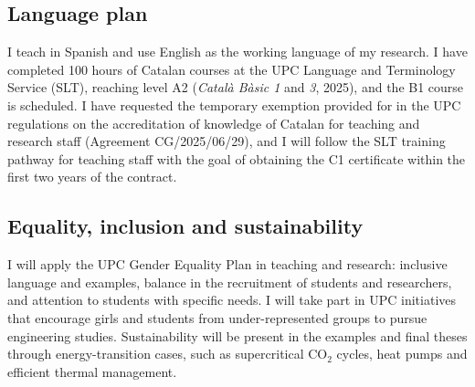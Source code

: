 \documentclass[11pt]{article}
\begin{document}
\subsection{Language plan}
I teach in Spanish and use English as the working language of my research. I have completed 100 hours of Catalan courses at the UPC Language and Terminology Service (SLT), reaching level A2 (\emph{Catal\`a B\`asic 1} and \emph{3}, 2025), and the B1 course is scheduled. I have requested the temporary exemption provided for in the UPC regulations on the accreditation of knowledge of Catalan for teaching and research staff (Agreement CG/2025/06/29), and I will follow the SLT training pathway for teaching staff with the goal of obtaining the C1 certificate within the first two years of the contract. 

\subsection{Equality, inclusion and sustainability}
I will apply the UPC Gender Equality Plan in teaching and research: inclusive language and
examples, balance in the recruitment of students and researchers, and attention to
students with specific needs. I will take part in UPC initiatives that encourage girls and
students from under-represented groups to pursue engineering studies. Sustainability will
be present in the examples and final theses through energy-transition cases, such as
supercritical CO$_2$ cycles, heat pumps and efficient thermal management.

\end{document}
